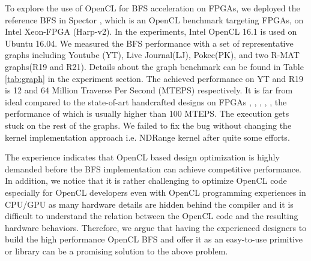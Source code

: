 To explore the use of OpenCL for BFS acceleration on FPGAs, we deployed 
the reference BFS in Spector \cite{gautier2016spector}, which is an OpenCL 
benchmark targeting FPGAs, on Intel Xeon-FPGA (Harp-v2). In the experiments, 
Intel OpenCL 16.1 is used on Ubuntu 16.04. We measured the BFS performance with 
a set of representative graphs including Youtube (YT), Live Journal(LJ), 
Pokec(PK), and two R-MAT graphs(R19 and R21). Details about the graph 
benchmark can be found in Table \ref{tab:graph} in the experiment section. 
The achieved performance on YT and R19 is 12 and 64 Million Traverse 
Per Second (MTEPS) respectively. It is far from ideal 
compared to the state-of-art handcrafted designs on FPGAs \cite{betkaoui2012reconfigurable}, 
\cite{attia2014cygraph}, \cite{zhang2017boosting}, \cite{nurvitadhi2014graphgen},
\cite{dai2016fpgp}, the performance of which is usually higher 
than 100 MTEPS. The execution gets stuck on the rest of the graphs. 
We failed to fix the bug without changing the kernel 
implementation approach i.e. NDRange kernel \cite{intelOpenCL} 
after quite some efforts. 



The experience indicates that OpenCL based design optimization is highly 
demanded before the BFS implementation can achieve competitive performance. 
In addition, we notice that it is rather challenging 
to optimize OpenCL code especially for OpenCL developers even with OpenCL programming experiences in CPU/GPU as many hardware details 
are hidden behind the compiler and it is difficult
to understand the relation between the OpenCL code and the resulting hardware behaviors. 
Therefore, we argue that having the experienced designers to build the high performance 
OpenCL BFS and offer it as an easy-to-use primitive or library can be a promising 
solution to the above problem.
 
